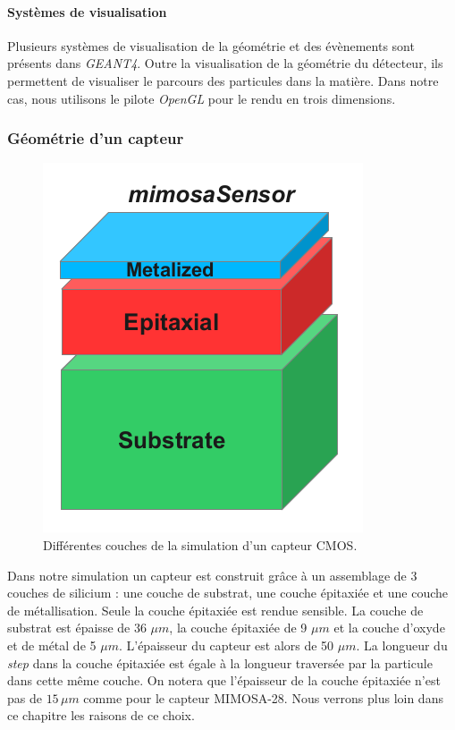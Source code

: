     \paragraph{Syst\`emes de visualisation}
    
    Plusieurs systèmes de visualisation de la g\'eom\'etrie et des \'ev\`enements sont pr\'esents dans \textit{GEANT4}. Outre la visualisation de la g\'eom\'etrie du d\'etecteur, ils permettent de visualiser le parcours des particules dans la mati\`ere. Dans notre cas, nous utilisons le pilote \textit{OpenGL} pour le rendu en trois dimensions.
    
    \subsubsection{Géométrie d'un capteur}
    
    \begin{figure}[!htb]
     \begin{center} 
      \includegraphics[scale=0.40]{./figures/couches_capteur.png}
      \caption{Diff\'erentes couches de la simulation d'un capteur CMOS.}
     \end{center}
    \end{figure}
    Dans notre simulation un capteur est construit gr\^ace \`a un assemblage de 3 couches de silicium : une couche de substrat, une couche épitaxiée et une couche de métallisation. Seule la couche épitaxiée est rendue sensible. La couche de substrat est \'epaisse de 36 $\mu m$, la couche \'epitaxi\'ee de 9 $\mu m$ et la couche d'oxyde et de m\'etal de 5 $\mu m$. L'épaisseur du capteur est alors de 50 $\mu m$. La longueur du \textit{step} dans la couche épitaxiée est \'egale \`a la longueur travers\'ee par la particule dans cette m\^eme couche. On notera que l'\'epaisseur de la couche \'epitaxi\'ee n'est pas de $15 \, \mu m$ comme pour le capteur MIMOSA-28. Nous verrons plus loin dans ce chapitre les raisons de ce choix.

